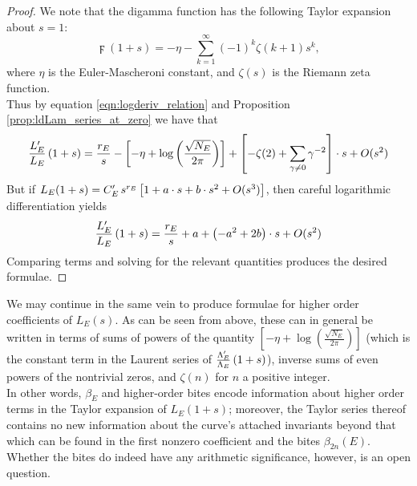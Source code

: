 \begin{proof}
We note that the digamma function has the following Taylor expansion about $s=1$:
\begin{equation}
\digamma(1+s) = -\eta - \sum_{k=1}^{\infty} (-1)^k \zeta(k+1) s^k,
\end{equation}
where $\eta$ is the Euler-Mascheroni constant, and $\zeta(s)$ is the Riemann zeta function. \\
Thus by equation \ref{eqn:logderiv_relation} and Proposition \ref{prop:ldLam_series_at_zero} we have that
\begin{equation*}
\frac{L_E^{\prime}}{L_E}\left(1+s\right) = \frac{r_E}{s} - \left[-\eta + \log\left(\frac{\sqrt{N_E}}{2\pi}\right)\right] + \left[-\zeta(2) + \sum_{\gamma\ne0} \gamma^{-2}\right]\cdot s + O(s^2)
\end{equation*}
But if $L_E(1+s) = C_E^{\prime} \, s^{r_E}\left[1 + a\cdot s + b\cdot s^2 + O(s^3)\right]$, then careful logarithmic differentiation yields
\begin{equation*}
\frac{L_E^{\prime}}{L_E}\left(1+s\right) = \frac{r_E}{s} + a + \left(-a^2 + 2b\right)\cdot s + O(s^2)
\end{equation*}
Comparing terms and solving for the relevant quantities produces the desired formulae.
\end{proof}
We may continue in the same vein to produce formulae for higher order coefficients of $L_E(s)$. As can be seen from above, these can in general be written in terms of sums of powers of the quantity $\left[-\eta + \log\left(\frac{\sqrt{N_E}}{2\pi}\right)\right]$ (which is the constant term in the Laurent series of $\frac{\Lambda_E^{\prime}}{\Lambda_E}\left(1+s\right)$), inverse sums of even powers of the nontrivial zeros, and $\zeta(n)$ for $n$ a positive integer. \\

In other words, $\beta_E$ and higher-order bites encode information about higher order terms in the Taylor expansion of $L_E(1+s)$; moreover, the Taylor series thereof contains no new information about the curve's attached invariants beyond that which can be found in the first nonzero coefficient and the bites $\beta_{2n}(E)$. Whether the bites do indeed have any arithmetic significance, however, is an open question. \\

